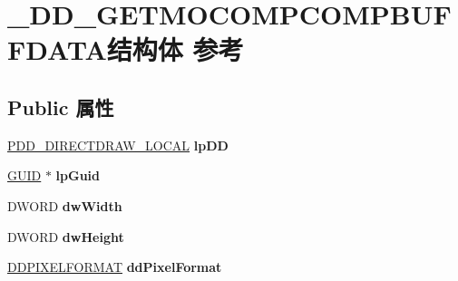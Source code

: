 \hypertarget{struct___d_d___g_e_t_m_o_c_o_m_p_c_o_m_p_b_u_f_f_d_a_t_a}{}\section{\+\_\+\+D\+D\+\_\+\+G\+E\+T\+M\+O\+C\+O\+M\+P\+C\+O\+M\+P\+B\+U\+F\+F\+D\+A\+T\+A结构体 参考}
\label{struct___d_d___g_e_t_m_o_c_o_m_p_c_o_m_p_b_u_f_f_d_a_t_a}
\subsection*{Public 属性}
\begin{DoxyCompactItemize}
\item 
\mbox{\label{struct___d_d___g_e_t_m_o_c_o_m_p_c_o_m_p_b_u_f_f_d_a_t_a_a44e50683d0e97bf91de7d51fa7745373}} 
\hyperlink{struct___d_d___d_i_r_e_c_t_d_r_a_w___l_o_c_a_l}{P\+D\+D\+\_\+\+D\+I\+R\+E\+C\+T\+D\+R\+A\+W\+\_\+\+L\+O\+C\+AL} {\bfseries lp\+DD}
\item 
\mbox{\label{struct___d_d___g_e_t_m_o_c_o_m_p_c_o_m_p_b_u_f_f_d_a_t_a_a57d5dcb7e7126c2b7ce955db8a6fc2ac}} 
\hyperlink{interface_g_u_i_d}{G\+U\+ID} $\ast$ {\bfseries lp\+Guid}
\item 
\mbox{\label{struct___d_d___g_e_t_m_o_c_o_m_p_c_o_m_p_b_u_f_f_d_a_t_a_a2a4a54298a2d20ccc520e93cccc2bb20}} 
D\+W\+O\+RD {\bfseries dw\+Width}
\item 
\mbox{\label{struct___d_d___g_e_t_m_o_c_o_m_p_c_o_m_p_b_u_f_f_d_a_t_a_ab26f2e65d72d1659eb7f62fdb6e72672}} 
D\+W\+O\+RD {\bfseries dw\+Height}
\item 
\mbox{\label{struct___d_d___g_e_t_m_o_c_o_m_p_c_o_m_p_b_u_f_f_d_a_t_a_a529c9d2b3075e592ee884319a9ccbc2d}} 
\hyperlink{struct___d_d_p_i_x_e_l_f_o_r_m_a_t}{D\+D\+P\+I\+X\+E\+L\+F\+O\+R\+M\+AT} {\bfseries dd\+Pixel\+Format}
\item 
\mbox{\label{struct___d_d___g_e_t_m_o_c_o_m_p_c_o_m_p_b_u_f_f_d_a_t_a_a2b3a9b48726741f30eb36d1b8be15685}} 

\end{DoxyCompactItemize}
